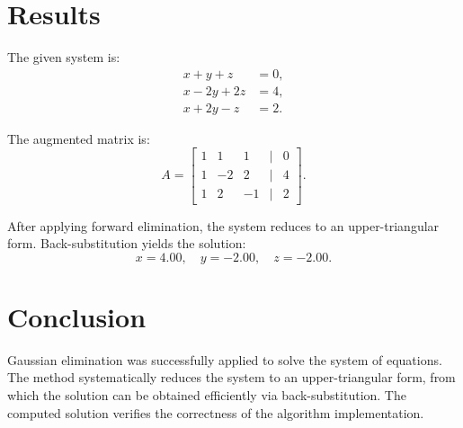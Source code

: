 \section*{Results} 
The given system is:
\[
\begin{aligned}
x + y + z &= 0, \\
x - 2y + 2z &= 4, \\
x + 2y - z &= 2.
\end{aligned}
\]

The augmented matrix is:
\[
A = 
\begin{bmatrix}
1 & 1 & 1 & | & 0 \\
1 & -2 & 2 & | & 4 \\
1 & 2 & -1 & | & 2
\end{bmatrix}.
\]

After applying forward elimination, the system reduces to an upper-triangular form. Back-substitution yields the solution:
\[
x = 4.00, \quad y = -2.00, \quad z = -2.00.
\]

\section*{Conclusion} 
Gaussian elimination was successfully applied to solve the system of equations. The method systematically reduces the system to an upper-triangular form, from which the solution can be obtained efficiently via back-substitution. The computed solution verifies the correctness of the algorithm implementation.

